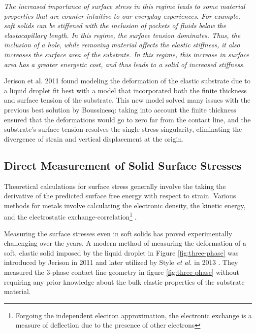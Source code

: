 \emph{The increased importance of surface stress in this regime leads to some material properties that are counter-intuitive to our everyday experiences. For example, soft solids can be stiffened with the inclusion of pockets of fluids below the elastocapillary length. In this regime, the surface tension dominates. Thus, the inclusion of a hole, while removing material affects the elastic stiffness, it also increases the surface area of the substrate. In this regime, this increase in surface area has a greater energetic cost, and thus leads to a solid of increased stiffness.}

Jerison et al. 2011 \cite{jerison2011deformation} found modeling the deformation of the elastic substrate due to a liquid droplet fit best with a model that incorporated both the finite thickness and surface tension of the substrate. This new model solved many issues with the previous best solution by Boussinesq: taking into account the finite thickness ensured that the deformations would go to zero far from the contact line, and the substrate's surface tension resolves the single stress singularity, eliminating the divergence of strain and vertical displacement at the origin. 


\subsection{Direct Measurement of Solid Surface Stresses}
Theoretical calculations for surface stress generally involve the taking the derivative of the predicted surface free energy with respect to strain. Various methods for metals involve calculating the electronic density, the kinetic energy, and the electrostatic exchange-correlation\footnote{Forgoing the independent electron approximation, the electronic exchange is a measure of deflection due to the presence of other electrons} \cite{GURTIN1978431}. 

Measuring the surface stresses even in soft solids has proved experimentally challenging over the years.  A modern method of measuring the deformation of a soft, elastic solid imposed by the liquid droplet in Figure \ref{fig:three-phase} was introduced by Jerison in 2011 \cite{jerison2011deformation} and later utilized by Style \emph{et al.} in 2013 \cite{style2013universal}. They measured the 3-phase contact line geometry in figure \ref{fig:three-phase} without requiring any prior knowledge about the bulk elastic properties of the substrate material. 

